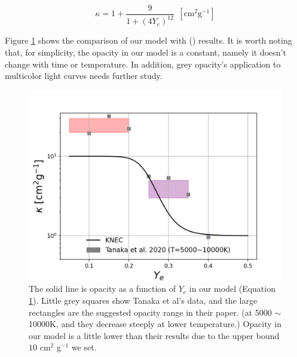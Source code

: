 \documentclass[fleqn,usenatbib]{mnras}
\begin{document}
\begin{itemize}
    
    \begin{equation}
    	\label{opacity_ye}
    	\kappa = 1 + \frac{9}{1+(4Y_e)^{12}}~~ \mathrm{ [cm^2 g^{-1}]}
    \end{equation}
    
    Figure \ref{opacity_Ye} shows the comparison of our model with (\cite{tanaka2020systematic}) results. It is worth noting that, for simplicity, the opacity in our model is a constant, namely it doesn't change with time or temperature. In addition, grey opacity's application to multicolor light curves needs further study.
   
    
    \begin{figure}
    \centering
    \includegraphics[scale=0.5]{figures/opacity_Ye.png}
    \caption{The solid line is opacity as a function of $Y_e$ in our model  (Equation \ref{opacity_Ye}). Little grey squares show Tanaka et al's data, and the large rectangles are the suggested opacity range in their paper. (at 5000 $\sim$ 10000K, and they decrease steeply at lower temperature.) Opacity in our model is a little lower than their results due to the upper bound $10$ cm$^2$ g$^{-1}$ we set.}
    \label{opacity_Ye}
    \end{figure} 
    


    
    

\end{itemize}
\end{document}
